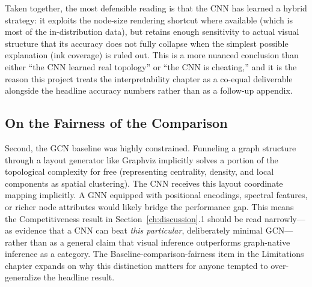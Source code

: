 \documentclass[11pt,letterpaper]{article}
\numberwithin{equation}{section}
\numberwithin{figure}{section}
\numberwithin{table}{section}
\begin{document}
Taken together, the most defensible reading is that the CNN has learned a hybrid strategy: it exploits the node-size rendering shortcut where available (which is most of the in-distribution data), but retains enough sensitivity to actual visual structure that its accuracy does not fully collapse when the simplest possible explanation (ink coverage) is ruled out. This is a more nuanced conclusion than either ``the CNN learned real topology'' or ``the CNN is cheating,'' and it is the reason this project treats the interpretability chapter as a co-equal deliverable alongside the headline accuracy numbers rather than as a follow-up appendix.

\subsection{On the Fairness of the Comparison}
Second, the GCN baseline was highly constrained. Funneling a graph structure through a layout generator like Graphviz implicitly solves a portion of the topological complexity for free (representing centrality, density, and local components as spatial clustering). The CNN receives this layout coordinate mapping implicitly. A GNN equipped with positional encodings, spectral features, or richer node attributes would likely bridge the performance gap. This means the Competitiveness result in Section~\ref{ch:discussion}.1 should be read narrowly---as evidence that a CNN can beat \emph{this particular}, deliberately minimal GCN---rather than as a general claim that visual inference outperforms graph-native inference as a category. The Baseline-comparison-fairness item in the Limitations chapter expands on why this distinction matters for anyone tempted to over-generalize the headline result.

\end{document}
